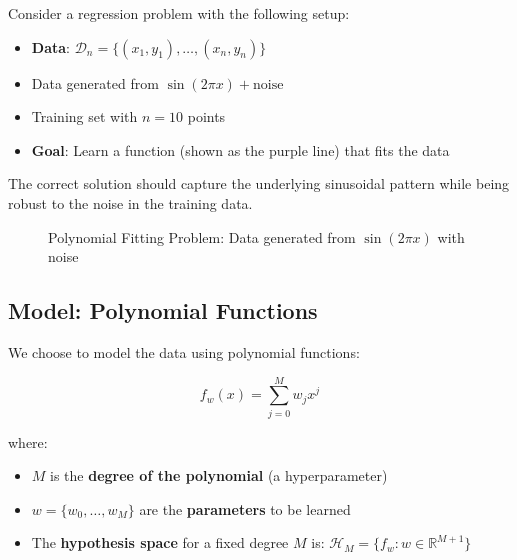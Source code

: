 \documentclass[11pt,a4paper]{article}
\theoremstyle{definition}
\theoremstyle{plain}
\theoremstyle{remark}
\begin{document}
Consider a regression problem with the following setup:
\begin{itemize}
    \item \textbf{Data}: $\mathcal{D}_n = \{(x_1, y_1), \ldots, (x_n, y_n)\}$
    \item Data generated from $\sin(2\pi x) + \text{noise}$
    \item Training set with $n = 10$ points
    \item \textbf{Goal}: Learn a function (shown as the purple line) that fits the data
\end{itemize}

The correct solution should capture the underlying sinusoidal pattern while being robust to the noise in the training data.

\begin{figure}[h]
\centering
{}
\caption{Polynomial Fitting Problem: Data generated from $\sin(2\pi x)$ with noise}
\end{figure}

\subsection{Model: Polynomial Functions}

We choose to model the data using polynomial functions:

\[
f_w(x) = \sum_{j=0}^{M} w_j x^j
\]

where:
\begin{itemize}
    \item $M$ is the \textbf{degree of the polynomial} (a hyperparameter)
    \item $w = \{w_0, \ldots, w_M\}$ are the \textbf{parameters} to be learned
    \item The \textbf{hypothesis space} for a fixed degree $M$ is: $\mathcal{H}_M = \{f_w : w \in \mathbb{R}^{M+1}\}$
\end{itemize}
\end{document}
